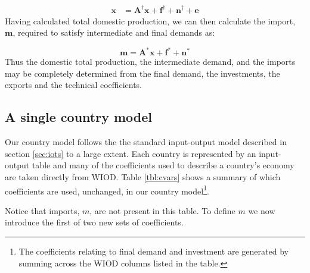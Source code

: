 \documentclass[a4paper]{article}
\begin{document}
\begin{align}
\boldsymbol{x}& = 
\boldsymbol{A^\dagger}\boldsymbol{x}
+ 
\boldsymbol{f^\dagger} + \boldsymbol{n^\dagger} + \boldsymbol{e} 
\label{eqn:xIRIO}
\end{align}
Having calculated total domestic production, we can then calculate the import, $\boldsymbol{m}$, required to satisfy intermediate and final demands as:

\begin{equation}\label{eqn:mIRIO}
\boldsymbol{m}
=
\boldsymbol{A^*}\boldsymbol{x}
+
\boldsymbol{f^*} + \boldsymbol{n^*} 
\end{equation}
Thus the domestic total production, the intermediate demand, and the imports may be completely determined from the final demand, the investments, the exports and the technical coefficients.

\subsection{A single country model}\label{sec:countries}
Our country model follows the the standard input-output model described in section \ref{sec:iots} to a large extent.
Each country is represented by an input-output table and many of the coefficients used to describe a country's economy are taken directly from WIOD.
Table \ref{tbl:cvars} shows a summary of which coefficients are used, unchanged, in our country model\footnote{The coefficients relating to final demand and investment are generated by summing across the WIOD columns listed in the table.}.

Notice that imports, $m$, are not present in this table.
To define $m$ we now introduce the first of two new sets of coefficients. 
\end{document}

